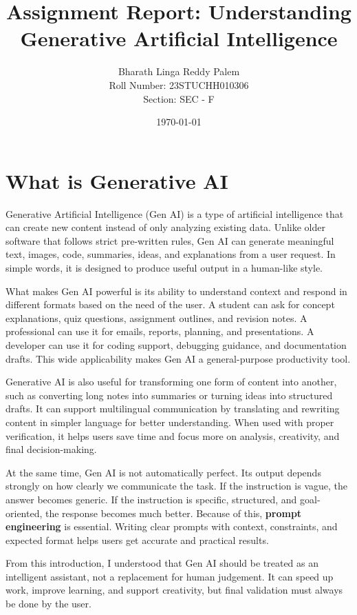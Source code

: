 \documentclass[12pt,a4paper]{article}
\title{Assignment Report: Understanding Generative Artificial Intelligence}
\author{Bharath Linga Reddy Palem\\
Roll Number: 23STUCHH010306\\
Section: SEC - F}
\date{\today}
\begin{document}
\maketitle
\onehalfspacing


\section*{What is Generative AI}
Generative Artificial Intelligence (Gen AI) is a type of artificial intelligence that can create new content instead of only analyzing existing data. Unlike older software that follows strict pre-written rules, Gen AI can generate meaningful text, images, code, summaries, ideas, and explanations from a user request. In simple words, it is designed to produce useful output in a human-like style.

What makes Gen AI powerful is its ability to understand context and respond in different formats based on the need of the user. A student can ask for concept explanations, quiz questions, assignment outlines, and revision notes. A professional can use it for emails, reports, planning, and presentations. A developer can use it for coding support, debugging guidance, and documentation drafts. This wide applicability makes Gen AI a general-purpose productivity tool.

Generative AI is also useful for transforming one form of content into another, such as converting long notes into summaries or turning ideas into structured drafts. It can support multilingual communication by translating and rewriting content in simpler language for better understanding. When used with proper verification, it helps users save time and focus more on analysis, creativity, and final decision-making.

At the same time, Gen AI is not automatically perfect. Its output depends strongly on how clearly we communicate the task. If the instruction is vague, the answer becomes generic. If the instruction is specific, structured, and goal-oriented, the response becomes much better. Because of this, \textbf{prompt engineering} is essential. Writing clear prompts with context, constraints, and expected format helps users get accurate and practical results.

From this introduction, I understood that Gen AI should be treated as an intelligent assistant, not a replacement for human judgement. It can speed up work, improve learning, and support creativity, but final validation must always be done by the user.
\end{document}
